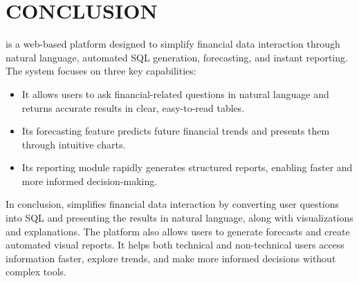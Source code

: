 \section{CONCLUSION}
\label{sec:conclusion}

\projname{} is a web-based platform designed to simplify financial data
interaction through natural language, automated SQL generation,
forecasting, and instant reporting. The system focuses on three key
capabilities:

\begin{itemize}
  \item It allows users to ask financial-related questions in natural
        language and returns accurate results in clear, easy-to-read
        tables.
  \item Its forecasting feature predicts future financial trends and
        presents them through intuitive charts.
  \item Its reporting module rapidly generates structured reports,
        enabling faster and more informed decision-making.
\end{itemize}

In conclusion, \projname{} simplifies financial data interaction by
converting user questions into SQL and presenting the results in natural
language, along with visualizations and explanations. The platform also
allows users to generate forecasts and create automated visual reports.
It helps both technical and non-technical users access information
faster, explore trends, and make more informed decisions without complex
tools.
